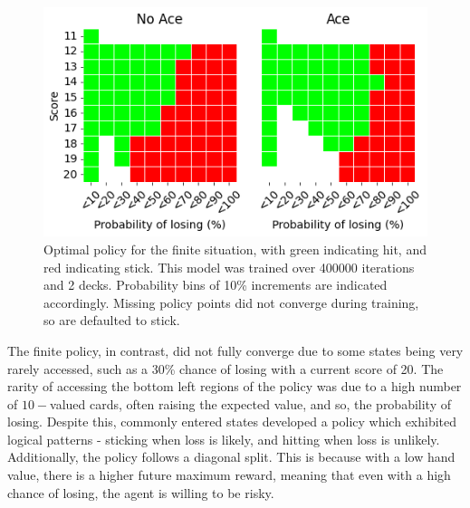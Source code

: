 \begin{figure}[h]
    \centering
    \includegraphics[width=\singlefigure]{figures/finite_optimal_policy.png}
    \caption{Optimal policy for the finite situation, with green indicating hit, and red indicating stick. This model was trained over 400000 iterations and 2 decks. Probability bins of 10\% increments are indicated accordingly. Missing policy points did not converge during training, so are defaulted to stick.}
    \label{fig: Optimal policy - Finite} 
\end{figure}

The finite policy, in contrast, did not fully converge due to some states being very rarely accessed, such as a 30\% chance of losing with a current score of 20. The rarity of accessing the bottom left regions of the policy was due to a high number of \(10-\)valued cards, often raising the expected value, and so, the probability of losing. Despite this, commonly entered states developed a policy which exhibited logical patterns - sticking when loss is likely, and hitting when loss is unlikely. Additionally, the policy follows a diagonal split. This is because with a low hand value, there is a higher future maximum reward, meaning that even with a high chance of losing, the agent is willing to be risky. 
